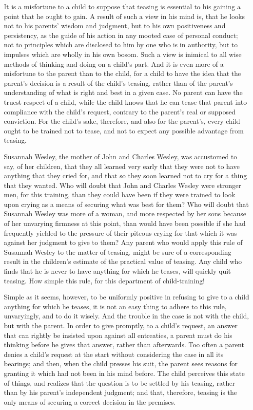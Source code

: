 \documentclass[
]{book}
\begin{document}
It is a misfortune to a child to suppose that teasing is essential to his gaining a point that he ought to gain. A result of such a view in his mind is, that he looks not to his parents' wisdom and judgment, but to his own positiveness and persistency, as the guide of his action in any mooted case of personal conduct; not to principles which are disclosed to him by one who is in authority, but to impulses which are wholly in his own bosom. Such a view is inimical to all wise methods of thinking and doing on a child's part. And it is even more of a misfortune to the parent than to the child, for a child to have the idea that the parent's decision is a result of the child's teasing, rather than of the parent's understanding of what is right and best in a given case. No parent can have the truest respect of a child, while the child knows that he can tease that parent into compliance with the child's request, contrary to the parent's real or supposed conviction. For the child's sake, therefore, and also for the parent's, every child ought to be trained not to tease, and not to expect any possible advantage from teasing.

Susannah Wesley, the mother of John and Charles Wesley, was accustomed to say, of her children, that they all learned very early that they were not to have anything that they cried for, and that so they soon learned not to cry for a thing that they wanted. Who will doubt that John and Charles Wesley were stronger men, for this training, than they could have been if they were trained to look upon crying as a means of securing what was best for them? Who will doubt that Susannah Wesley was more of a woman, and more respected by her sons because of her unvarying firmness at this point, than would have been possible if she had frequently yielded to the pressure of their piteous crying for that which it was against her judgment to give to them? Any parent who would apply this rule of Susannah Wesley to the matter of teasing, might be sure of a corresponding result in the children's estimate of the practical value of teasing. Any child who finds that he is never to have anything for which he teases, will quickly quit teasing. How simple this rule, for this department of child-training!

Simple as it seems, however, to be uniformly positive in refusing to give to a child anything for which he teases, it is not an easy thing to adhere to this rule, unvaryingly, and to do it wisely. And the trouble in the case is not with the child, but with the parent. In order to give promptly, to a child's request, an answer that can rightly be insisted upon against all entreaties, a parent must do his thinking before he gives that answer, rather than afterwards. Too often a parent denies a child's request at the start without considering the case in all its bearings; and then, when the child presses his suit, the parent sees reasons for granting it which had not been in his mind before. The child perceives this state of things, and realizes that the question is to be settled by his teasing, rather than by his parent's independent judgment; and that, therefore, teasing is the only means of securing a correct decision in the premises.
\end{document}
